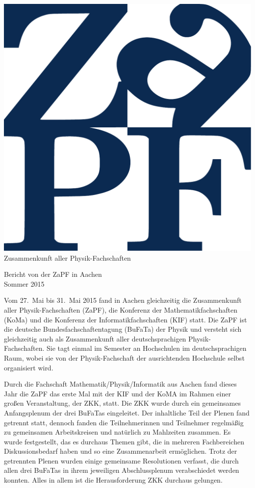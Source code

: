 \documentclass{scrartcl}
\begin{document}
\hspace{0.74\textwidth}
\begin{minipage}{0.25\textwidth}
	  \vspace{-1cm}
	  \centering
	  \includegraphics[width=.89\textwidth]{logo.pdf}
	  \small Zusammenkunft aller Physik-Fachschaften
\end{minipage}

\begin{center}
	  \vspace{1.5cm}
	  \huge{Bericht von der ZaPF in Aachen \\ Sommer 2015}
	  \vspace{1cm}
\end{center}

Vom  27.\ Mai bis 31.\ Mai 2015 fand in Aachen gleichzeitig die Zusammenkunft
aller Physik-Fachschaften (ZaPF), die Konferenz der Mathematikfachschaften
(KoMa) und die Konferenz der Informatikfachschaften (KIF) statt. Die ZaPF ist
die deutsche  Bundesfachschaftentagung (BuFaTa) der Physik und versteht sich
gleichzeitig auch  als Zusammenkunft aller deutschsprachigen
Physik-Fachschaften. Sie tagt einmal im Semester an Hochschulen im
deutschsprachigen Raum, wobei sie  von der  Physik-Fachschaft der ausrichtenden
Hochschule selbst organisiert wird.

Durch die Fachschaft Mathematik/Physik/Informatik aus Aachen fand dieses Jahr
die ZaPF das erste Mal mit der KIF und der KoMA im Rahmen einer großen
Veranstaltung, der ZKK, statt. Die ZKK wurde durch ein gemeinsames
Anfangsplenum der drei BuFaTas eingeleitet. Der inhaltliche Teil der Plenen
fand getrennt statt, dennoch fanden die Teilnehmerinnen und Teilnehmer
regelmäßig zu gemeinsamen Arbeitskreisen und natürlich zu Mahlzeiten
zusammen. Es wurde festgestellt, das es durchaus Themen gibt, die in mehreren
Fachbereichen Diskussionsbedarf haben und so eine Zusammenarbeit ermöglichen.
Trotz der getrennten Plenen wurden einige gemeinsame
Resolutionen verfasst, die durch allen drei BuFaTas in ihrem
jeweiligen Abschlussplenum verabschiedet werden konnten. Alles in allem
ist die Herausforderung ZKK durchaus gelungen.
\end{document}
